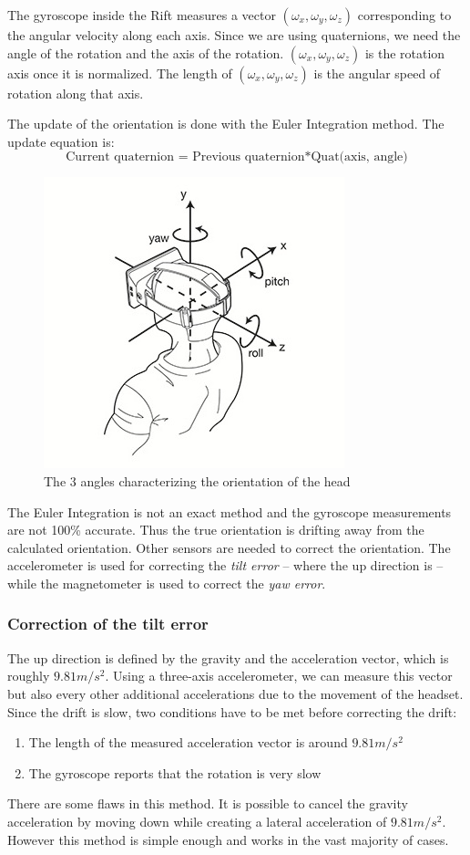 \documentclass[12pt]{article}
\begin{document}
The gyroscope inside the Rift measures a vector $(\omega_x,\omega_y,\omega_z)$ corresponding to the angular velocity along each axis. Since we are using quaternions, we need the angle of the rotation and the axis of the rotation. $(\omega_x,\omega_y,\omega_z)$ is the rotation axis once it is normalized. The length of $(\omega_x,\omega_y,\omega_z)$ is the angular speed of rotation along that axis.

The update of the orientation is done with the Euler Integration method. The update equation is:
$$\text{Current quaternion = Previous quaternion} * \text{Quat(axis, angle)}$$

\begin{figure}[h]
  \centering
  \includegraphics[scale=3]{OculusHead.jpg}
  \caption{\label{fig:ypr} The 3 angles characterizing the orientation of the head}
\end{figure}

The Euler Integration is not an exact method and the gyroscope measurements are not 100\% accurate. Thus the true orientation is drifting away from the calculated orientation. Other sensors are needed to correct the orientation. The accelerometer is used for correcting the \textit{tilt error} -- where the up direction is -- while the magnetometer is used to correct the \textit{yaw error}.

\subsubsection{Correction of the tilt error}
The up direction is defined by the gravity and the acceleration vector, which is roughly $9.81m/s^2$. Using a three-axis accelerometer, we can measure this vector but also every other additional accelerations due to the movement of the headset. Since the drift is slow, two conditions have to be met before correcting the drift:
\begin{enumerate}
\item The length of the measured acceleration vector is around $9.81m/s^2$
\item The gyroscope reports that the rotation is very slow
\end{enumerate}
There are some flaws in this method. It is possible to cancel the gravity acceleration by moving down while creating a lateral acceleration of $9.81m/s^2$. However this method is simple enough and works in the vast majority of cases.
\end{document}
